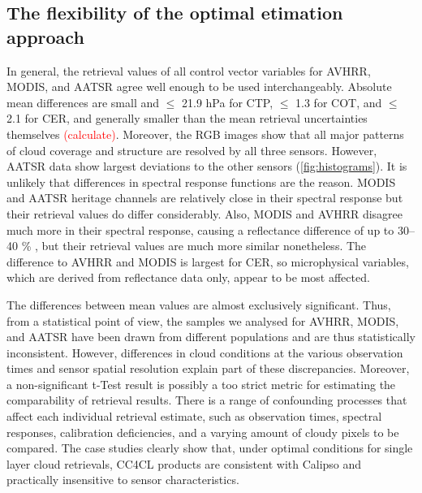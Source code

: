 \conclusions[Discussion]\label{conclusions}

\subsection{The flexibility of the optimal etimation approach}


In general, the retrieval values of all control vector variables for AVHRR, MODIS, and AATSR agree well enough to be used interchangeably. Absolute mean differences are small and $\leq$ 21.9 hPa for CTP, $\leq$ 1.3 for COT, and $\leq$ 2.1 for CER, and generally smaller than the mean retrieval uncertainties themselves \textcolor{red}{(calculate)}. Moreover, the RGB images show that all major patterns of cloud coverage and structure are resolved by all three sensors. However, AATSR data show largest deviations to the other sensors (\cref{fig:histograms}). It is unlikely that differences in spectral response functions are the reason. MODIS and AATSR heritage channels are relatively close in their spectral response but their retrieval values do differ considerably. Also, MODIS and AVHRR disagree much more in their spectral response, causing a reflectance difference of up to 30--40 \% \citep{Trishchenko02}, but their retrieval values are much more similar nonetheless. The difference to AVHRR and MODIS is largest for CER, so microphysical variables, which are derived from reflectance data only, appear to be most affected. 

The differences between mean values are almost exclusively significant. Thus, from a statistical point of view, the samples we analysed for AVHRR, MODIS, and AATSR have been drawn from different populations and are thus statistically inconsistent. However, differences in cloud conditions at the various observation times and sensor spatial resolution explain part of these discrepancies. Moreover, a non-significant t-Test result is possibly a too strict metric for estimating the comparability of retrieval results. There is a range of confounding processes that affect each individual retrieval estimate, such as observation times, spectral responses, calibration deficiencies, and a varying amount of cloudy pixels to be compared. The case studies clearly show that, under optimal conditions for single layer cloud retrievals, CC4CL products are consistent with Calipso and practically insensitive to sensor characteristics.

